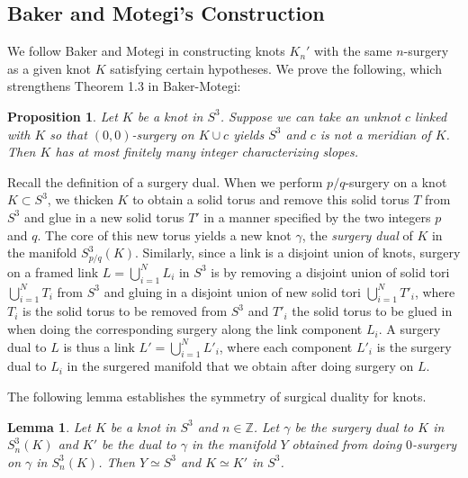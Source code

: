 \documentclass[11pt,usenames,dvipsnames,reqno]{amsart}
\numberwithin{theorem}{section}
\newtheorem{lemma}[theorem]{Lemma}
\newtheorem{proposition}[theorem]{Proposition}
\theoremstyle{ex}
\theoremstyle{rem}
\begin{document}
\subsection{Baker and Motegi's Construction} We follow Baker and Motegi \cite{baker-motegi} in constructing knots $K_n'$ with the same $n$-surgery as a given knot $K$ satisfying certain hypotheses. We prove the following, which strengthens Theorem 1.3 in Baker-Motegi:

\begin{proposition}\label{prop 2.3}
	Let $K$ be a knot in $S^3$. Suppose we can take an unknot $c$ linked with $K$ so that $(0,0)$-surgery on $K\cup c$ yields $S^3$ and $c$ is not a meridian of $K$. Then $K$ has at most finitely many integer characterizing slopes.
\end{proposition}

Recall the definition of a surgery dual. When we perform $p/q$-surgery on a knot $K\subset S^3$, we thicken $K$ to obtain a solid torus and remove this solid torus $T$ from $S^3$ and glue in a new solid torus $T'$ in a manner specified by the two integers $p$ and $q$. The core of this new torus yields a new knot $\gamma$, the \textit{surgery dual} of $K$ in the manifold $S^3_{p/q}(K)$. Similarly, since a link is a disjoint union of knots, surgery on a framed link $L =\bigcup^{N}_{i=1} L_i$ in $S^3$ is by removing a disjoint union of solid tori $\bigcup^{N}_{i=1} T_i$ from $S^3$ and gluing in a disjoint union of new solid tori $\bigcup^{N}_{i=1} T'_i$, where $T_i$ is the solid torus to be removed from $S^3$ and $T'_i$ the solid torus to be glued in when doing the corresponding surgery along the link component $L_i$. A surgery dual to $L$ is thus a link $L' = \bigcup^{N}_{i=1} L'_i$, where each component $L'_i$ is the surgery dual to $L_i$ in the surgered manifold that we obtain after doing surgery on $L$.

The following lemma establishes the symmetry of surgical duality for knots.

\begin{lemma}
	Let $K$ be a knot in $S^3$ and $n\in\mathbb{Z}$. Let $\gamma$ be the surgery dual to $K$ in $S^3_n(K)$ and $K'$ be the dual to $\gamma$ in the manifold $Y$ obtained from doing $0$-surgery on $\gamma$ in $S^3_n(K)$. Then $Y\simeq S^3$ and $K\simeq K'$ in $S^3$.
\end{lemma}
\end{document}
